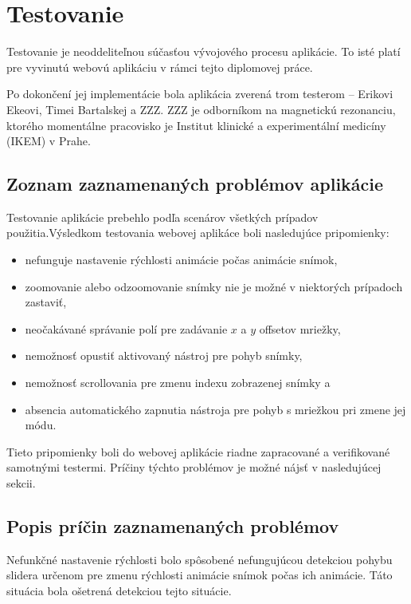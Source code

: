 \chapter {Testovanie}
Testovanie je neoddeliteľnou súčasťou vývojového procesu aplikácie. To isté platí pre vyvinutú webovú aplikáciu v rámci tejto diplomovej práce.

Po dokončení jej implementácie bola aplikácia zverená trom testerom -- Erikovi Ekeovi, Timei Bartalskej a ZZZ. ZZZ je odborníkom na magnetickú rezonanciu, ktorého momentálne pracovisko je Institut klinické a experimentální medicíny (IKEM) v Prahe. 

\section {Zoznam zaznamenaných problémov aplikácie}
Testovanie aplikácie prebehlo podľa scenárov všetkých prípadov použitia.\newline Výsledkom testovania webovej aplikáce boli nasledujúce pripomienky:
\begin {itemize}
\item {nefunguje nastavenie rýchlosti animácie počas animácie snímok,}
\item {zoomovanie alebo odzoomovanie snímky nie je možné v niektorých prípadoch zastaviť,}
\item {neočakávané správanie polí pre zadávanie $x$ a $y$ offsetov mriežky,}
\item {nemožnosť opustiť aktivovaný nástroj pre pohyb snímky,}
\item {nemožnosť scrollovania pre zmenu indexu zobrazenej snímky a}
\item {absencia automatického zapnutia nástroja pre pohyb s mriežkou pri zmene jej módu.}
\end {itemize}

Tieto pripomienky boli do webovej aplikácie riadne zapracované a verifikované samotnými testermi.
Príčiny týchto problémov je možné nájsť v nasledujúcej sekcii.

\section {Popis príčin zaznamenaných problémov}
Nefunkčné nastavenie rýchlosti bolo spôsobené nefungujúcou detekciou pohybu slidera určenom pre zmenu rýchlosti animácie snímok počas ich animácie. Táto situácia bola ošetrená detekciou tejto situácie.


